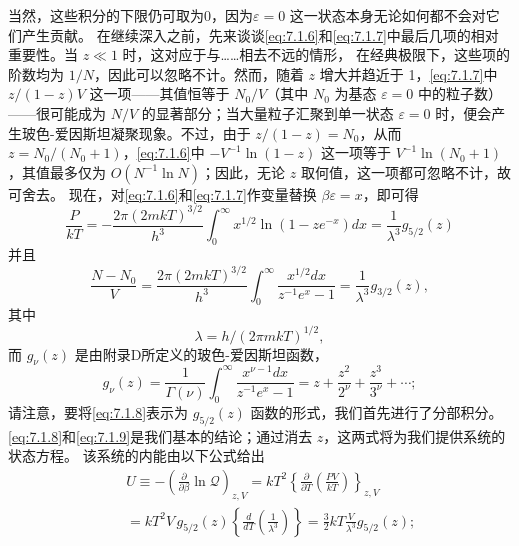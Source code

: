 当然，这些积分的下限仍可取为0，因为\(\varepsilon=0\) 这一状态本身无论如何都不会对它们产生贡献。
在继续深入之前，先来谈谈\autoref{eq:7.1.6}和\autoref{eq:7.1.7}中最后几项的相对重要性。当 \(z \ll 1\) 时，这对应于与\ldots\ldots 相去不远的情形，
在经典极限下，这些项的阶数均为 \(1/N\)，因此可以忽略不计。然而，随着 \(z\) 增大并趋近于 1，\autoref{eq:7.1.7}中 \(z/(1-z)V\) 这一项——其值恒等于 \(N_0/V\)（其中 \(N_0\) 为基态 \(\varepsilon=0\) 中的粒子数）——很可能成为 \(N/V\) 的显著部分；当大量粒子汇聚到单一状态 \(\varepsilon=0\) 时，便会产生玻色-爱因斯坦凝聚现象。不过，由于 \(z/(1-z)=N_0\)，从而 \(z=N_0/(N_0+1)\)，\autoref{eq:7.1.6}中 \(-V^{-1}\ln(1-z)\) 这一项等于 \(V^{-1}\ln(N_0+1)\)，其值最多仅为 \(O(N^{-1}\ln N)\)；因此，无论 \(z\) 取何值，这一项都可忽略不计，故可舍去。
现在，对\autoref{eq:7.1.6}和\autoref{eq:7.1.7}作变量替换 \(\beta \varepsilon = x\)，即可得
\begin{equation}\tag{7.1.8}\label{eq:7.1.8}
\frac { P } { k T } = - \frac { 2 \pi ( 2 m k T ) ^{3 / 2} } { h ^{3} } \int _ { 0 } ^{\infty} x ^{1 / 2} \ln ( 1 - z e ^{- x} ) d x = \frac { 1 } { \lambda ^{3} } g _ { 5 / 2 } ( z )
\end{equation}
并且
\begin{equation}\tag{7.1.9}\label{eq:7.1.9}
\frac { N - N _ { 0 } } { V } = \frac { 2 \pi ( 2 m k T ) ^{3 / 2} } { h ^{3} } \int _ { 0 } ^{\infty} \frac { x ^{1 / 2} d x } { z ^{- 1} e ^{x} - 1 } = \frac { 1 } { \lambda ^{3} } g _ { 3 / 2 } ( z ) ,
\end{equation}
其中
\begin{equation}\tag{7.1.10}\label{eq:7.1.10}
\lambda = h / ( 2 \pi m k T ) ^{1 / 2} ,
\end{equation}
而 \(g_{\nu}(z)\) 是由附录D所定义的玻色-爱因斯坦函数，
\begin{equation}\tag{7.1.11}\label{eq:7.1.11}
g _ { \nu } ( z ) = \frac { 1 } { \Gamma ( \nu ) } \int _ { 0 } ^{\infty} \frac { x ^{\nu - 1} d x } { z ^{- 1} e ^{x} - 1 } = z + \frac { z ^{2} } { 2 ^{\nu} } + \frac { z ^{3} } { 3 ^{\nu} } + \cdots ;
\end{equation}
请注意，要将\autoref{eq:7.1.8}表示为 \(g_{5/2}(z)\) 函数的形式，我们首先进行了分部积分。\autoref{eq:7.1.8}和\autoref{eq:7.1.9}是我们基本的结论；通过消去 \(z\)，这两式将为我们提供系统的状态方程。
该系统的内能由以下公式给出
\begin{equation}\tag{7.1.12}\label{eq:7.1.12}
\begin{array}{rlr} & { } & { U \equiv - \left( \frac { \partial } { \partial \beta } \ln \mathcal { Q } \right) _ { z , V } = k T ^{2} \left\{ \frac { \partial } { \partial T } \left( \frac { P V } { k T } \right) \right\} _ { z , V } } \\& { } & { = k T ^{2} V \, g _ { 5 / 2 } ( z ) \left\{ \frac { d } { d T } \left( \frac { 1 } { \lambda ^{3} } \right) \right\} = \frac { 3 } { 2 } k T \frac { V } { \lambda ^{3} } g _ { 5 / 2 } ( z ) ; } \end{array}
\end{equation}
